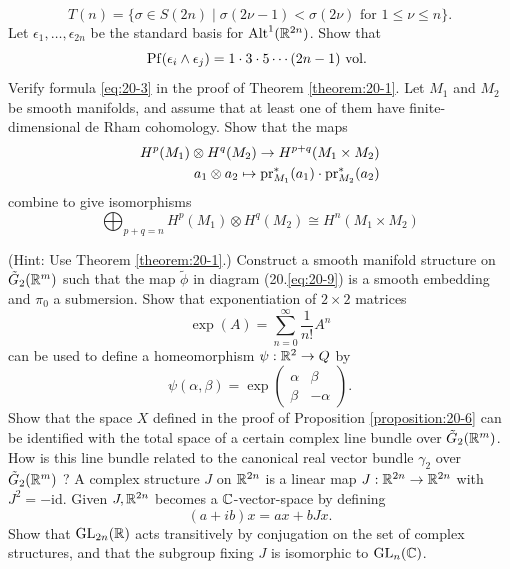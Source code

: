 \begin{enumerate}[label=\theexercise.\arabic*.,ref=\theexercise.\arabic*,leftmargin=2.7em]
    \[
      T( n)  = \{ \sigma  \in  S( {2n})  \mid  \sigma ( {{2\nu }- 1})  < \sigma ( {2\nu }) \text{ for }1 \leq  \nu  \leq  n\}.
    \]
  \NewItem Let ${\epsilon }_{1},\ldots,{\epsilon }_{2n}$ be the standard basis for ${\operatorname{Alt}}^{1}( {\mathbb{R}}^{2n})$. Show that
    \[
      \mathrm{Pf}( {{\epsilon }_{i} \land  {\epsilon }_{j}})  = 1 \cdot  3 \cdot  5\cdots ( {{2n}- 1}) \text{ vol. }
    \]
  \newchap[20]
  \NewItem Verify formula \eqref{eq:20-3} in the proof of Theorem \ref{theorem:20-1}.
  \NewItem Let ${M}_{1}$ and ${M}_{2}$ be smooth manifolds, and assume that at least one of them have finite-dimensional de Rham cohomology. Show that the maps
    \[
    \begin{aligned}
      {H}^{p}( {M}_{1})  \otimes H^{q}( {M}_{2})  \rightarrow H^{p + q}( {{M}_{1} \times  {M}_{2}}) \\
      {a}_{1} \otimes  {a}_{2} \mapsto  {\ensuremath{\mathrm{pr}}}_{{M}_{1}}^*( {a}_{1})  \cdot  {\ensuremath{\mathrm{pr}}}_{{M}_{2}}^*( {a}_{2})
    \end{aligned}
    \]
    combine to give isomorphisms
    \[
      \bigoplus_{p + q = n} H^{p}( {M}_{1})  \otimes H^{q}( {M}_{2})  \cong H^{n}( {{M}_{1} \times  {M}_{2}})
    \]
    \par(Hint: Use Theorem \ref{theorem:20-1}.)
  \NewItem Construct a smooth manifold structure on ${\tilde{G}}_{2}({\mathbb{R}}^{m})$ such that the map $\tilde{\phi }$ in diagram (20.\ref{eq:20-9}) is a smooth embedding and ${\pi}_{0}$ a submersion.
  \NewItem Show that exponentiation of $2 \times  2$ matrices
    \[
      \exp ( A)  = \sum_{{n = 0}}^{\infty }\frac{1}{n!}{A}^{n}
    \]
    can be used to define a homeomorphism $\psi  : {\mathbb{R}}^{2} \rightarrow  Q$ by
    \[
      \psi ( {\alpha,\beta })  = \exp \begin{pmatrix} \alpha & \beta \\ \beta & - \alpha  \end{pmatrix}.
    \]
    Show that the space $X$ defined in the proof of Proposition \ref{proposition:20-6} can be identified with the total space of a certain complex line bundle over ${\tilde{G}}_{2}( {\mathbb{R}}^{m})$. How is this line bundle related to the canonical real vector bundle ${\gamma }_{2}$ over ${\tilde{G}}_{2}( {\mathbb{R}}^{m})$ ?
  \NewItem A complex structure $J$ on ${\mathbb{R}}^{2n}$ is a linear map $J : {\mathbb{R}}^{2n} \rightarrow  {\ensuremath{\mathbb{R}}}^{2n}$ with ${J}^{2} = - \mathrm{{id}}$. Given $J,{{\mathbb{R}}}^{2n}$ becomes a $\mathbb{C}$-vector-space by defining
    \[
      ( {a + {ib}}) x = {ax} + {bJx}.
    \]
    Show that ${\mathrm{{GL}}}_{2n}( \mathbb{R})$ acts transitively by conjugation on the set of complex structures, and that the subgroup fixing $J$ is isomorphic to ${\mathrm{{GL}}}_{n}( \mathbb{C})$.

\end{enumerate}
